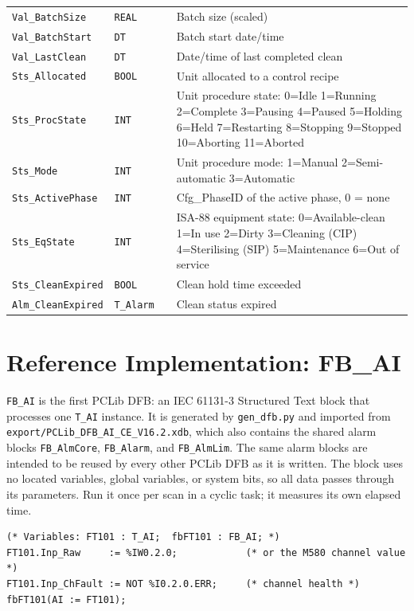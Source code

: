\begin{small}
\begin{longtable}{@{}P{3.70cm}P{2.20cm}P{1.70cm}P{8.91cm}@{}}
\texttt{Val\_BatchSize} & \texttt{REAL} &  & Batch size (scaled) \\
\texttt{Val\_BatchStart} & \texttt{DT} &  & Batch start date/\allowbreak{}time \\
\texttt{Val\_LastClean} & \texttt{DT} &  & Date/\allowbreak{}time of last completed clean \\
\texttt{Sts\_Allocated} & \texttt{BOOL} &  & Unit allocated to a control recipe \\
\texttt{Sts\_ProcState} & \texttt{INT} &  & Unit procedure state: 0=Idle 1=Running 2=Complete 3=Pausing 4=Paused 5=Holding 6=Held 7=Restarting 8=Stopping 9=Stopped 10=Aborting 11=Aborted \\
\texttt{Sts\_Mode} & \texttt{INT} &  & Unit procedure mode: 1=Manual 2=Semi-automatic 3=Automatic \\
\texttt{Sts\_ActivePhase} & \texttt{INT} &  & Cfg\_PhaseID of the active phase, 0 = none \\
\texttt{Sts\_EqState} & \texttt{INT} &  & ISA-88 equipment state: 0=Available-clean 1=In use 2=Dirty 3=Cleaning (CIP) 4=Sterilising (SIP) 5=Maintenance 6=Out of service \\
\texttt{Sts\_CleanExpired} & \texttt{BOOL} &  & Clean hold time exceeded \\
\texttt{Alm\_CleanExpired} & \texttt{T\_Alarm} &  & Clean status expired \\
\bottomrule
\end{longtable}
\end{small}

\section{Reference Implementation: FB\_AI}\label{sec:pclib-fbai}
\texttt{FB\_AI} is the first PCLib DFB: an IEC 61131-3 Structured Text block that processes one \texttt{T\_AI} instance. It is generated by \texttt{gen\_dfb.py} and imported from \texttt{export/PCLib\_DFB\_AI\_CE\_V16.2.xdb}, which also contains the shared alarm blocks \texttt{FB\_AlmCore}, \texttt{FB\_Alarm}, and \texttt{FB\_AlmLim}. The same alarm blocks are intended to be reused by every other PCLib DFB as it is written. The block uses no located variables, global variables, or system bits, so all data passes through its parameters. Run it once per scan in a cyclic task; it measures its own elapsed time.

\begin{small}
\begin{verbatim}
(* Variables: FT101 : T_AI;  fbFT101 : FB_AI; *)
FT101.Inp_Raw     := %IW0.2.0;            (* or the M580 channel value *)
FT101.Inp_ChFault := NOT %I0.2.0.ERR;     (* channel health *)
fbFT101(AI := FT101);
\end{verbatim}
\end{small}


